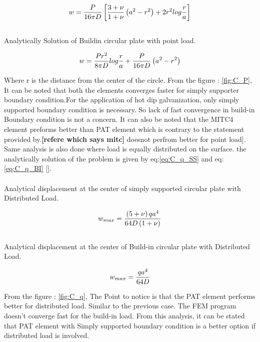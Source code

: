 \documentclass[main.tex]{subfiles}
\begin{document}
\begin{equation}{\label{eq:C_P_SS}}
w=\frac{P}{16 \pi D} \left[\frac{3+\nu}{1+\nu}\left(a^2-r^2\right)+2r^2log\frac{r}{a}\right]
\end{equation}
\\
Analytically Solution of Buildin circular plate with point load.

\begin{equation}{\label{eq:C_P_BI}}
w=\frac{Pr^2}{8 \pi D} log\frac{r}{a}+\frac{P}{16 \pi D} \left(a^2 - r^2 \right)
\end{equation}\par
Where r is the distance from the center of the circle. From the figure : \ref{fig:C_P}, It can be noted that both the elements converges faster for simply supporter boundary condition.For the application of hot dip galvanization, only simply supported boundary condition is necessary. So lack of fast convergence in build-in Boundary condition is not a concern. It can also be noted that the MITC4 element preforms better than PAT element which is contrary to the statement provided by.\textbf{[refere which says mitc]} doesnot perfrom better for point load]. Same analysis is also done where load is equally distributed on the surface. the analytically solution of the problem is given by eq:\ref{eq:C_q_SS} and eq:\ref{eq:C_q_BI} [\cite{TIMOPLATES}].
\\
\\
Analytical displacement at the center of simply supported circular plate with Distributed Load.

\begin{equation}{\label{eq:C_q_SS}}
w_{max}=\frac{\left(5+\nu\right)qa^4}{64 D \left(1+\nu\right)} 
\end{equation}
\\
Analytical displacement at the center of Build-in circular plate with Distributed Load.

\begin{equation}{\label{eq:C_q_BI}}
w_{max}=\frac{qa^4}{64 D} 
\end{equation}
\par
From the figure : \ref{fig:C_q}, The Point to notice is that the PAT element performs better for distributed load. Similar to the previous case. The FEM program doesn't converge fast for the build-in load. From this analysis, it can be stated that PAT element with Simply supported boundary condition is a better option if distributed load is involved.  \par
\end{document}
